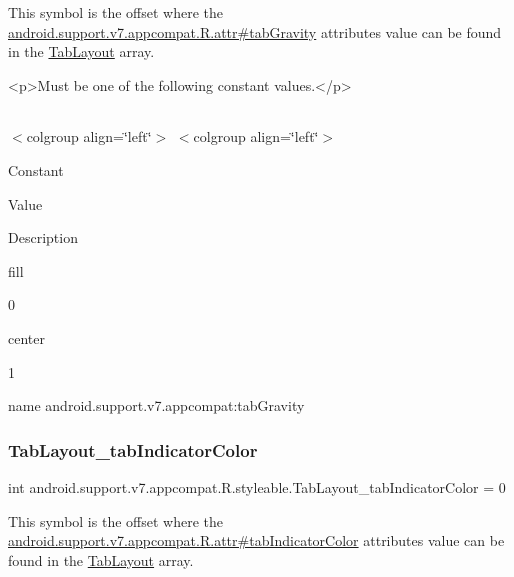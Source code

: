 This symbol is the offset where the \hyperlink{classandroid_1_1support_1_1v7_1_1appcompat_1_1R_1_1attr_a5d6760873df12ac6f6ed6f1972613390}{android.\+support.\+v7.\+appcompat.\+R.\+attr\#tab\+Gravity} attribute\textquotesingle{}s value can be found in the \hyperlink{classandroid_1_1support_1_1v7_1_1appcompat_1_1R_1_1styleable_a3c85d0c4cebbccf5b1a16ecfe13938ca}{Tab\+Layout} array.

\begin{DoxyVerb}      <p>Must be one of the following constant values.</p>
\end{DoxyVerb}
 \tabulinesep=1mm
\begin{longtabu} spread 0pt [c]{*{0}{|X[-1]}|}
\hline
\end{longtabu}
$<$colgroup align=\char`\"{}left\char`\"{}$>$ $<$colgroup align=\char`\"{}left\char`\"{}$>$ 

Constant

Value

Description 

{\ttfamily fill}

0

{\ttfamily center}

1

name android.\+support.\+v7.\+appcompat\+:tab\+Gravity \mbox{\label{classandroid_1_1support_1_1v7_1_1appcompat_1_1R_1_1styleable_a8c08dea36fe43fa447fca13e8dbb0fb8}} 
\subsubsection{\texorpdfstring{Tab\+Layout\+\_\+tab\+Indicator\+Color}{TabLayout\_tabIndicatorColor}}
{\footnotesize\ttfamily int android.\+support.\+v7.\+appcompat.\+R.\+styleable.\+Tab\+Layout\+\_\+tab\+Indicator\+Color = 0\hspace{0.3cm}{\ttfamily [static]}}

This symbol is the offset where the \hyperlink{classandroid_1_1support_1_1v7_1_1appcompat_1_1R_1_1attr_a21aa1690b4be79b22f649ba6804cc05f}{android.\+support.\+v7.\+appcompat.\+R.\+attr\#tab\+Indicator\+Color} attribute\textquotesingle{}s value can be found in the \hyperlink{classandroid_1_1support_1_1v7_1_1appcompat_1_1R_1_1styleable_a3c85d0c4cebbccf5b1a16ecfe13938ca}{Tab\+Layout} array.

